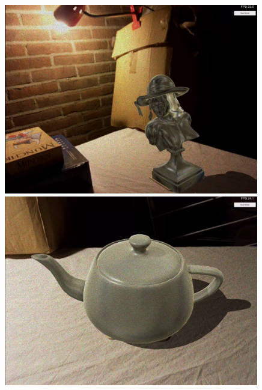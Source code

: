 \begin{figure}[H]
\begin{minipage}{0.475\textwidth}
    \end{minipage}\hfill
    \begin{minipage}{0.475\textwidth}
        \centering
        \includegraphics[width=0.99\textwidth]{Figures/Lena1.png} %
    \end{minipage}\hfill
        \begin{minipage}{0.475\textwidth}
        \centering
        \includegraphics[width=0.99\textwidth]{Figures/TeapotVirtual.png} %
    \end{minipage}\hfill
    \begin{minipage}{0.475\textwidth}
        \centering

\end{minipage}
\end{figure}

